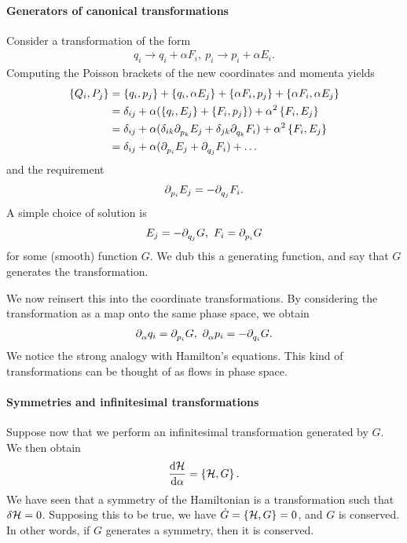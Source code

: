 \paragraph{Generators of canonical transformations}
Consider a transformation of the form
\begin{align*}
	q_{i} \to q_{i} + \alpha F_{i},\ p_{i} \to p_{i} + \alpha E_{i}.
\end{align*}
Computing the Poisson brackets of the new coordinates and momenta yields
\begin{align*}
	\left\{Q_{i}, P_{j}\right\} &= \left\{q_{i}, p_{j}\right\} + \left\{q_{i}, \alpha E_{j}\right\} + \left\{\alpha F_{i}, p_{j}\right\} + \left\{\alpha F_{i}, \alpha E_{j}\right\} \\
	                   &= \delta_{ij} + \alpha(\left\{q_{i}, E_{j}\right\} + \left\{F_{i}, p_{j}\right\}) + \alpha^{2}\left\{F_{i}, E_{j}\right\} \\
	                   &= \delta_{ij} + \alpha(\delta_{ik}\partial^{}_{p_{k}}E_{j} + \delta_{jk}\partial^{}_{q_{k}}F_{i}) + \alpha^{2}\left\{F_{i}, E_{j}\right\} \\
	                   &= \delta_{ij} + \alpha(\partial^{}_{p_{i}}E_{j} + \partial^{}_{q_{j}}F_{i}) + \dots
\end{align*}
and the requirement
\begin{align*}
	\partial^{}_{p_{i}}E_{j} = -\partial^{}_{q_{j}}F_{i}.
\end{align*}
A simple choice of solution is
\begin{align*}
	E_{j} = -\partial^{}_{q_{j}}G,\ F_{i} = \partial^{}_{p_{i}}G
\end{align*}
for some (smooth) function $G$. We dub this a generating function, and say that $G$ generates the transformation.

We now reinsert this into the coordinate transformations. By considering the transformation as a map onto the same phase space, we obtain
\begin{align*}
	\partial^{}_{\alpha}q_{i} = \partial^{}_{p_{i}}G,\ \partial^{}_{\alpha}p_{i} = -\partial^{}_{q_{i}}G.
\end{align*}
We notice the strong analogy with Hamilton's equations. This kind of transformations can be thought of as flows in phase space. 

\paragraph{Symmetries and infinitesimal transformations}
Suppose now that we perform an infinitesimal transformation generated by $G$. We then obtain
\begin{align*}
	\dv{\mathcal{H}}{\alpha} = \left\{\mathcal{H}, G\right\}.
\end{align*}
We have seen that a symmetry of the Hamiltonian is a transformation such that $\delta \mathcal{H} = 0$. Supposing this to be true, we have $\dot{G} = \left\{\mathcal{H}, G\right\} = 0$, and $G$ is conserved. In other words, if $G$ generates a symmetry, then it is conserved.

